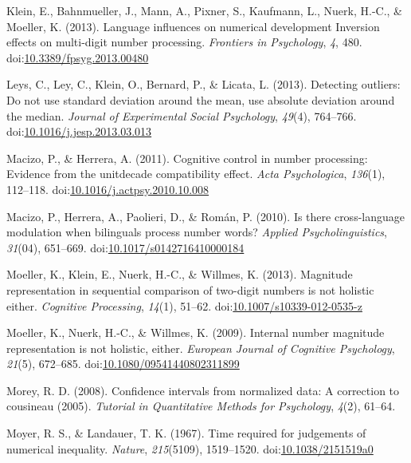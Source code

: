 \documentclass[english,man]{apa6}
\theoremstyle{definition}
\theoremstyle{definition}
\theoremstyle{definition}
\theoremstyle{remark}
\begin{document}
\hypertarget{ref-klein2013}{}
Klein, E., Bahnmueller, J., Mann, A., Pixner, S., Kaufmann, L., Nuerk,
H.-C., \& Moeller, K. (2013). Language influences on numerical
development Inversion effects on multi-digit number processing.
\emph{Frontiers in Psychology}, \emph{4}, 480.
doi:\href{https://doi.org/10.3389/fpsyg.2013.00480}{10.3389/fpsyg.2013.00480}

\hypertarget{ref-leys2013}{}
Leys, C., Ley, C., Klein, O., Bernard, P., \& Licata, L. (2013).
Detecting outliers: Do not use standard deviation around the mean, use
absolute deviation around the median. \emph{Journal of Experimental
Social Psychology}, \emph{49}(4), 764--766.
doi:\href{https://doi.org/10.1016/j.jesp.2013.03.013}{10.1016/j.jesp.2013.03.013}

\hypertarget{ref-macizo2011}{}
Macizo, P., \& Herrera, A. (2011). Cognitive control in number
processing: Evidence from the unitdecade compatibility effect.
\emph{Acta Psychologica}, \emph{136}(1), 112--118.
doi:\href{https://doi.org/10.1016/j.actpsy.2010.10.008}{10.1016/j.actpsy.2010.10.008}

\hypertarget{ref-macizo2010}{}
Macizo, P., Herrera, A., Paolieri, D., \& Román, P. (2010). Is there
cross-language modulation when bilinguals process number words?
\emph{Applied Psycholinguistics}, \emph{31}(04), 651--669.
doi:\href{https://doi.org/10.1017/s0142716410000184}{10.1017/s0142716410000184}

\hypertarget{ref-moeller2013}{}
Moeller, K., Klein, E., Nuerk, H.-C., \& Willmes, K. (2013). Magnitude
representation in sequential comparison of two-digit numbers is not
holistic either. \emph{Cognitive Processing}, \emph{14}(1), 51--62.
doi:\href{https://doi.org/10.1007/s10339-012-0535-z}{10.1007/s10339-012-0535-z}

\hypertarget{ref-moeller2009}{}
Moeller, K., Nuerk, H.-C., \& Willmes, K. (2009). Internal number
magnitude representation is not holistic, either. \emph{European Journal
of Cognitive Psychology}, \emph{21}(5), 672--685.
doi:\href{https://doi.org/10.1080/09541440802311899}{10.1080/09541440802311899}

\hypertarget{ref-morey2008}{}
Morey, R. D. (2008). Confidence intervals from normalized data: A
correction to cousineau (2005). \emph{Tutorial in Quantitative Methods
for Psychology}, \emph{4}(2), 61--64.

\hypertarget{ref-moyer1967}{}
Moyer, R. S., \& Landauer, T. K. (1967). Time required for judgements of
numerical inequality. \emph{Nature}, \emph{215}(5109), 1519--1520.
doi:\href{https://doi.org/10.1038/2151519a0}{10.1038/2151519a0}
\end{document}
